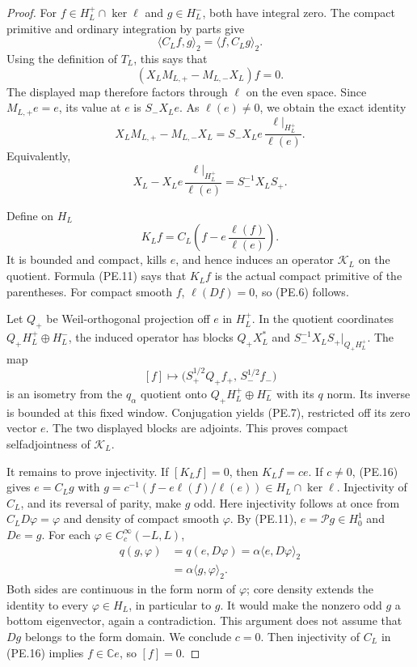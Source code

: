 \begin{proof}
For \(f\in H_L^+\cap\ker\ell\) and \(g\in H_L^-\), both have
integral zero.  The compact primitive and ordinary integration
by parts give
\[
 \langle C_Lf,g\rangle_2=\langle f,C_Lg\rangle_2.
\]
Using the definition of \(T_L\), this says that
\[
       (X_LM_{L,+}-M_{L,-}X_L)f=0 .
\]
The displayed map therefore factors through \(\ell\) on the even
space.  Since \(M_{L,+}e=e\), its value at \(e\) is
\(S_-X_Le\).  As \(\ell(e)\ne0\), we obtain the exact identity
\[
 X_LM_{L,+}-M_{L,-}X_L
       =S_-X_Le\,\frac{\ell|_{H_L^+}}{\ell(e)}.
 \tag{PE.14}
\]
Equivalently,
\[
 X_L-X_Le\,\frac{\ell|_{H_L^+}}{\ell(e)}
                     =S_-^{-1}X_LS_+ .
 \tag{PE.15}
\]

Define on \(H_L\)
\[
 K_Lf=C_L\left(f-e\,\frac{\ell(f)}{\ell(e)}\right).
 \tag{PE.16}
\]
It is bounded and compact, kills \(e\), and hence induces an
operator \(\mathcal K_L\) on the quotient.  Formula (PE.11) says
that \(K_Lf\) is the actual compact primitive of the parentheses.
For compact smooth \(f\), \(\ell(Df)=0\), so (PE.6) follows.

Let \(Q_+\) be Weil-orthogonal projection off \(e\) in \(H_L^+\).
In the quotient coordinates
\(Q_+H_L^+\oplus H_L^-\), the induced operator has blocks
\(Q_+X_L^*\) and \(S_-^{-1}X_LS_+|_{Q_+H_L^+}\).
The map
\[
 [f]\longmapsto
   \bigl(S_+^{1/2}Q_+f_+,\,S_-^{1/2}f_-\bigr)
 \tag{PE.17}
\]
is an isometry from the \(q_\alpha\) quotient onto
\(Q_+H_L^+\oplus H_L^-\) with its \(q\) norm.
Its inverse is bounded at this fixed window.
Conjugation yields (PE.7), restricted off its zero vector \(e\).
The two displayed blocks are adjoints.  This proves compact
selfadjointness of \(\mathcal K_L\).

It remains to prove injectivity.
If \([K_Lf]=0\), then \(K_Lf=ce\).
If \(c\ne0\), (PE.16) gives \(e=C_Lg\) with
\(g=c^{-1}(f-e\ell(f)/\ell(e))\in H_L\cap\ker\ell\).
Injectivity of \(C_L\), and its reversal of parity, make \(g\)
odd.  Here injectivity follows at once from
\(C_LD\varphi=\varphi\) and density of compact smooth \(\varphi\).
By (PE.11), \(e=\mathcal P g\in H^1_0\) and \(De=g\).
For each \(\varphi\in C_c^\infty(-L,L)\),
\[
 \begin{aligned}
 q(g,\varphi)&=q(e,D\varphi)
     =\alpha\langle e,D\varphi\rangle_2\\
     &=\alpha\langle g,\varphi\rangle_2 .
 \end{aligned}
 \tag{PE.18}
\]
Both sides are continuous in the form norm of \(\varphi\);
core density extends the identity to every \(\varphi\in H_L\),
in particular to \(g\).  It would make the nonzero odd \(g\)
a bottom eigenvector, again a contradiction.
This argument does not assume that \(Dg\) belongs to the form
domain.  We conclude \(c=0\).
Then injectivity of \(C_L\) in (PE.16) implies
\(f\in\mathbb C e\), so \([f]=0\).


\end{proof}
